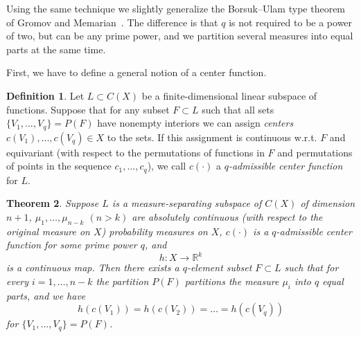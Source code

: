 \documentclass[12pt,a4paper,oneside]{amsart}
\newtheorem{thm}{Theorem}[section]
\theoremstyle{definition}
\newtheorem{defn}[thm]{Definition}
\theoremstyle{remark}
\numberwithin{equation}{section}
\begin{document}
Using the same technique we slightly generalize the Borsuk--Ulam type theorem of Gromov and Memarian~\cite[Theorem~3]{mem2009}. The difference is that $q$ is not required to be a power of two, but can be any prime power, and we partition several measures into equal parts at the same time. 

First, we have to define a general notion of a center function.

\begin{defn}
Let $L\subset C(X)$ be a finite-dimensional linear subspace of functions. Suppose that for any subset $F\subset L$ such that all sets $\{V_1,\ldots,V_q\} = P(F)$ have nonempty interiors we can assign \emph{centers} $c(V_1),\ldots, c(V_q)\in X$ to the sets. If this assignment is continuous w.r.t. $F$ and equivariant (with respect to the permutations of functions in $F$ and permutations of points in the sequence $c_1, \ldots, c_q$), we call $c(\cdot)$ a \emph{$q$-admissible center function} for $L$.
\end{defn}

\begin{thm}
\label{gromov-gen}
Suppose $L$ is a measure-separating subspace of $C(X)$ of dimension $n+1$, $\mu_1,\ldots, \mu_{n-k}$ $(n>k)$ are absolutely continuous (with respect to the original measure on $X$) probability measures on $X$, $c(\cdot)$ is a $q$-admissible center function for some prime power $q$, and 
$$
h: X\to \mathbb R^k
$$
is a continuous map. Then there exists a $q$-element subset $F\subset L$ such that for every $i=1,\ldots,n-k$ the partition $P(F)$ partitions the measure $\mu_i$ into $q$ equal parts, and we have 
$$
h(c(V_1)) = h(c(V_2)) =\dots = h(c(V_q))
$$
for $\{V_1, \ldots, V_q\} = P(F)$.
\end{thm}
\end{document}
